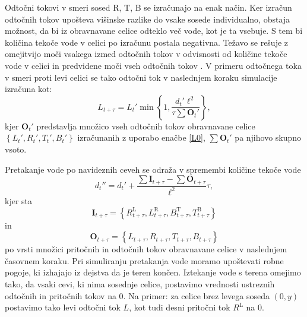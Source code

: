\documentclass[9pt]{pnas-new}
\newcommand{\set}[1]{\ensuremath{\mathbf{#1}}}
\renewcommand{\vec}[1]{\ensuremath{\mathbf{#1}}}
\begin{document}
Odtočni tokovi v smeri sosed R, T, B se izračunajo na enak način. Ker izračun odtočnih tokov upošteva višinske razlike do vsake sosede individualno, obstaja možnost, da bi iz obravnavane celice odteklo več vode, kot je ta vsebuje. S tem bi količina tekoče vode v celici po izračunu postala negativna. Težavo se rešuje z omejitvijo moči vsakega izmed odtočnih tokov v odvisnosti od količine tekoče vode v celici in predvidene moči vseh odtočnih tokov \cite{benevs_fast_gpu_07,maske_2013}. V primeru odtočnega toka v smeri proti levi celici se tako odtočni tok v naslednjem koraku simulacije izračuna kot:
\begin{equation}
L_{t+\tau} = {L_t}' \min\left\{1, \frac{{d_{t}}' \ell^2}{\tau \sum {\set{O}_t}'}\right\},
\end{equation}
kjer ${\set{O}_t}'$ predstavlja množico vseh odtočnih tokov obravnavane celice $\left\{{L_t}', {R_t}', {T_t}', {B_t}'\right\}$ izračunanih z uporabo enačbe \eqref{L0}, $\sum {\set{O}_t}'$ pa njihovo skupno vsoto.

Pretakanje vode po navideznih ceveh se odraža v spremembi količine tekoče vode
\begin{equation}
{d_{t}}'' = {d_{t}}' + \frac{\sum \set{I}_{t + \tau} - \sum \vec{O}_{t + \tau}}{\ell^2} \tau,
\end{equation}
kjer sta $$\set{I}_{t + \tau} = \left\{R^\mathrm{L}_{t + \tau}, L^\mathrm{R}_{t + \tau}, B^\mathrm{T}_{t + \tau}, T^\mathrm{B}_{t + \tau}\right\}$$ in $$\set{O}_{t + \tau} = \left\{L_{t + \tau}, R_{t + \tau}, T_{t + \tau}, B_{t + \tau}\right\}$$ po vrsti množici pritočnih in odtočnih tokov obravnavane celice v naslednjem časovnem koraku. Pri simuliranju pretakanja vode moramo upoštevati robne pogoje, ki izhajajo iz dejstva da je teren končen. Iztekanje vode s terena omejimo tako, da vsaki cevi, ki nima sosednje celice, postavimo vrednosti ustreznih odtočnih in pritočnih tokov na 0. Na primer: za celice brez levega soseda $(0,y)$ postavimo tako levi odtočni tok $L$, kot tudi desni pritočni tok $R^\mathrm{L}$ na 0.
\end{document}
